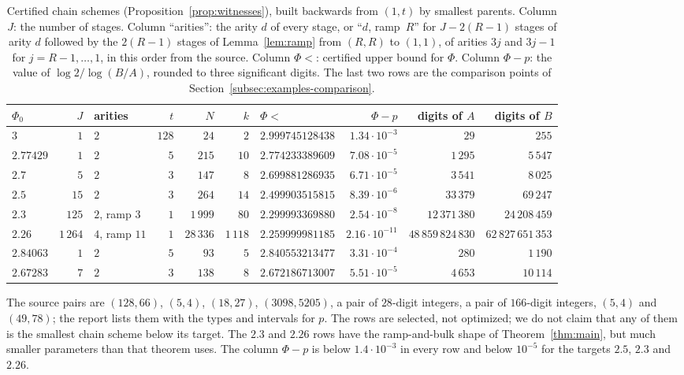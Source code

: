 \begin{table}[t]
\centering
\small
\setlength{\tabcolsep}{3pt}
\begin{tabular}{lrlrrrlrrr}
\toprule
\(\Phi_0\)&\(J\)&arities&\(t\)&\(N\)&\(k\)&\(\Phi<\)&\(\Phi-p\)
 &digits of \(A\)&digits of \(B\)\\
\midrule
\(3\)&\(1\)&\(2\)&\(128\)&\(24\)&\(2\)&\(2.999745128438\)
 &\(1.34\cdot10^{-3}\)&\(29\)&\(255\)\\
\(2.77429\)&\(1\)&\(2\)&\(5\)&\(215\)&\(10\)&\(2.774233389609\)
 &\(7.08\cdot10^{-5}\)&\(1\,295\)&\(5\,547\)\\
\(2.7\)&\(5\)&\(2\)&\(3\)&\(147\)&\(8\)&\(2.699881286935\)
 &\(6.71\cdot10^{-5}\)&\(3\,541\)&\(8\,025\)\\
\(2.5\)&\(15\)&\(2\)&\(3\)&\(264\)&\(14\)&\(2.499903515815\)
 &\(8.39\cdot10^{-6}\)&\(33\,379\)&\(69\,247\)\\
\(2.3\)&\(125\)&\(2\), ramp \(3\)&\(1\)&\(1\,999\)&\(80\)
 &\(2.299993369880\)&\(2.54\cdot10^{-8}\)&\(12\,371\,380\)
 &\(24\,208\,459\)\\
\(2.26\)&\(1\,264\)&\(4\), ramp \(11\)&\(1\)&\(28\,336\)&\(1\,118\)
 &\(2.259999981185\)&\(2.16\cdot10^{-11}\)&\(48\,859\,824\,830\)
 &\(62\,827\,651\,353\)\\
\midrule
\(2.84063\)&\(1\)&\(2\)&\(5\)&\(93\)&\(5\)&\(2.840553213477\)
 &\(3.31\cdot10^{-4}\)&\(280\)&\(1\,190\)\\
\(2.67283\)&\(7\)&\(2\)&\(3\)&\(138\)&\(8\)&\(2.672186713007\)
 &\(5.51\cdot10^{-5}\)&\(4\,653\)&\(10\,114\)\\
\bottomrule
\end{tabular}
\caption{Certified chain schemes (Proposition~\ref{prop:witnesses}),
built backwards from \((1,t)\) by smallest parents. Column \(J\): the
number of stages. Column ``arities'': the arity \(d\) of every stage,
or ``\(d\), ramp~\(R\)'' for \(J-2(R-1)\) stages of arity \(d\) followed
by the \(2(R-1)\) stages of Lemma~\ref{lem:ramp} from \((R,R)\) to
\((1,1)\), of arities \(3j\) and \(3j-1\) for \(j=R-1,\ldots,1\), in
this order from the source. Column \(\Phi<\): certified upper bound for
\(\Phi\). Column \(\Phi-p\): the value of \(\log2/\log(B/A)\), rounded to
three significant digits. The last two rows are the comparison points of
Section~\ref{subsec:examples-comparison}.}
\label{tab:witnesses}
\end{table}

The source pairs are \((128,66)\), \((5,4)\), \((18,27)\),
\((3098,5205)\), a pair of \(28\)-digit integers, a pair of
\(166\)-digit integers, \((5,4)\) and \((49,78)\); the report lists them
with the types and intervals for \(p\). The rows are selected, not
optimized; we do not claim that any of them is the smallest chain scheme
below its target. The \(2.3\) and \(2.26\) rows have the ramp-and-bulk
shape of Theorem~\ref{thm:main}, but much smaller parameters than that
theorem uses. The column \(\Phi-p\) is below \(1.4\cdot10^{-3}\) in
every row and below \(10^{-5}\) for the targets \(2.5\), \(2.3\)
and~\(2.26\).

